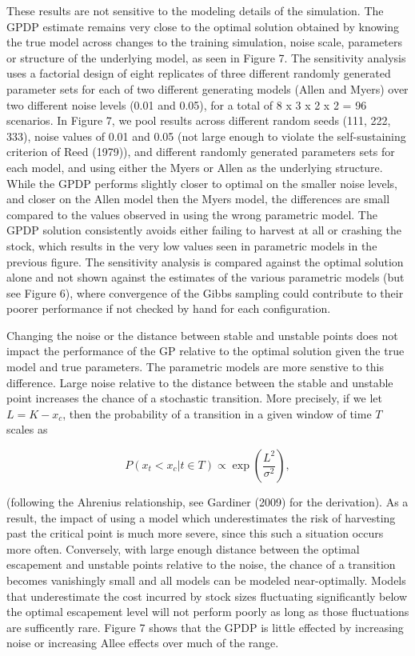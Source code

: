 \documentclass[]{components/elsarticle}
\begin{document}
These results are not sensitive to the modeling details of the
simulation. The GPDP estimate remains very close to the optimal solution
obtained by knowing the true model across changes to the training
simulation, noise scale, parameters or structure of the underlying
model, as seen in Figure 7. The sensitivity analysis uses a factorial
design of eight replicates of three different randomly generated
parameter sets for each of two different generating models (Allen and
Myers) over two different noise levels (0.01 and 0.05), for a total of 8
x 3 x 2 x 2 = 96 scenarios. In Figure 7, we pool results across
different random seeds (111, 222, 333), noise values of 0.01 and 0.05
(not large enough to violate the self-sustaining criterion of Reed
(1979)), and different randomly generated parameters sets for each
model, and using either the Myers or Allen as the underlying structure.
While the GPDP performs slightly closer to optimal on the smaller noise
levels, and closer on the Allen model then the Myers model, the
differences are small compared to the values observed in using the wrong
parametric model. The GPDP solution consistently avoids either failing
to harvest at all or crashing the stock, which results in the very low
values seen in parametric models in the previous figure. The sensitivity
analysis is compared against the optimal solution alone and not shown
against the estimates of the various parametric models (but see Figure
6), where convergence of the Gibbs sampling could contribute to their
poorer performance if not checked by hand for each configuration.

Changing the noise or the distance between stable and unstable points
does not impact the performance of the GP relative to the optimal
solution given the true model and true parameters. The parametric models
are more senstive to this difference. Large noise relative to the
distance between the stable and unstable point increases the chance of a
stochastic transition. More precisely, if we let $L = K - x_c$, then the
probability of a transition in a given window of time $T$ scales as

\[P(x_t < x_c | t \in T) \propto  \exp\left(\frac{L^2}{\sigma^2}\right),\]

(following the Ahrenius relationship, see Gardiner (2009) for the
derivation). As a result, the impact of using a model which
underestimates the risk of harvesting past the critical point is much
more severe, since this such a situation occurs more often. Conversely,
with large enough distance between the optimal escapement and unstable
points relative to the noise, the chance of a transition becomes
vanishingly small and all models can be modeled near-optimally. Models
that underestimate the cost incurred by stock sizes fluctuating
significantly below the optimal escapement level will not perform poorly
as long as those fluctuations are sufficently rare. Figure 7 shows that
the GPDP is little effected by increasing noise or increasing Allee
effects over much of the range.
\end{document}
